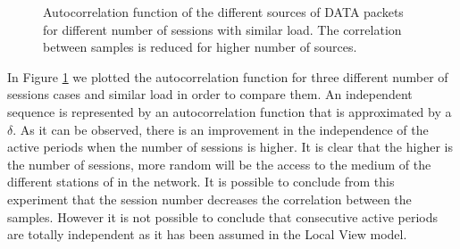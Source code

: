 \begin{figure}[h!]
	\centering
	\caption{Autocorrelation function of the different sources of DATA packets for different number of sessions with similar load. The correlation between samples is reduced for higher number of sources.}
	\label{fig:autocorrelation_sessions}
\end{figure}

In Figure \ref{fig:autocorrelation_sessions} we plotted the autocorrelation function for three different number of sessions cases and similar load in order to compare them. An independent sequence is represented by an autocorrelation function that is approximated by a $\delta$. As it can be observed, there is an improvement in the independence of the active periods when the number of sessions is higher. It is clear that the higher is the number of sessions, more random will be the access to the medium of the different stations of in the network. It is possible to conclude from this experiment that the session number decreases the correlation between the samples. However it is not possible to conclude that consecutive active periods are totally independent as it has been assumed in the Local View model.

